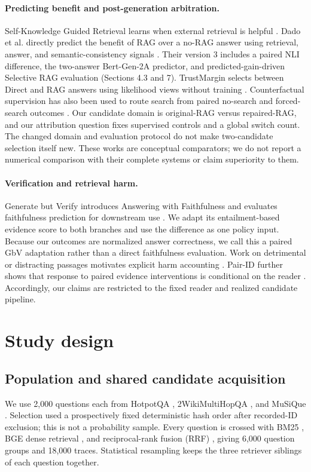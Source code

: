 \documentclass[11pt]{article}
\begin{document}
\paragraph{Predicting benefit and post-generation arbitration.}
Self-Knowledge Guided Retrieval learns when external retrieval is helpful \citep{wang2023skr}. Dado et al. directly predict the benefit of RAG over a no-RAG answer using retrieval, answer, and semantic-consistency signals \citep{dado2026benefit}. Their version 3 includes a paired NLI difference, the two-answer Bert-Gen-2A predictor, and predicted-gain-driven Selective RAG evaluation (Sections 4.3 and 7). TrustMargin selects between Direct and RAG answers using likelihood views without training \citep{xu2026trustmargin}. Counterfactual supervision has also been used to route search from paired no-search and forced-search outcomes \citep{kim2026search}. Our candidate domain is original-RAG versus repaired-RAG, and our attribution question fixes supervised controls and a global switch count. The changed domain and evaluation protocol do not make two-candidate selection itself new. These works are conceptual comparators; we do not report a numerical comparison with their complete systems or claim superiority to them.

\paragraph{Verification and retrieval harm.}
Generate but Verify introduces Answering with Faithfulness and evaluates faithfulness prediction for downstream use \citep{filice2025gbv}. We adapt its entailment-based evidence score to both branches and use the difference as one policy input. Because our outcomes are normalized answer correctness, we call this a paired GbV adaptation rather than a direct faithfulness evaluation. Work on detrimental or distracting passages motivates explicit harm accounting \citep{oh2023detrimental,amiraz2025distracting}. Pair-ID further shows that response to paired evidence interventions is conditional on the reader \citep{du2026pairid}. Accordingly, our claims are restricted to the fixed reader and realized candidate pipeline.

\section{Study design}
\subsection{Population and shared candidate acquisition}
We use 2,000 questions each from HotpotQA \citep{yang2018hotpotqa}, 2WikiMultiHopQA \citep{ho2020twowiki}, and MuSiQue \citep{trivedi2022musique}. Selection used a prospectively fixed deterministic hash order after recorded-ID exclusion; this is not a probability sample. Every question is crossed with BM25 \citep{robertson2009bm25}, BGE dense retrieval \citep{xiao2023bge}, and reciprocal-rank fusion (RRF) \citep{cormack2009rrf}, giving 6,000 question groups and 18,000 traces. Statistical resampling keeps the three retriever siblings of each question together.
\end{document}

